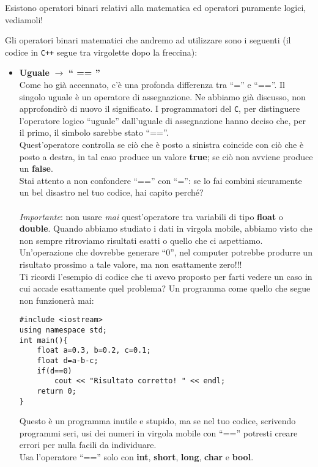 	
	Esistono operatori binari relativi alla matematica ed operatori puramente logici, vediamoli!
	
	Gli operatori binari matematici che andremo ad utilizzare sono i seguenti (il codice in \verb|C++| segue tra virgolette dopo la freccina):
	\begin{itemize}
	\item \textbf{Uguale} $\to$ \textbf{`` == ''}
		\\Come ho già accennato, c'è una profonda differenza tra ``='' e ``==''. Il singolo uguale è un operatore di assegnazione. Ne abbiamo già discusso, non approfondirò di nuovo il significato. I programmatori del \verb|C|, per distinguere l'operatore logico ``uguale'' dall'uguale di assegnazione hanno deciso che, per il primo, il simbolo sarebbe stato ``==''.\\
		Quest'operatore controlla se ciò che è posto a sinistra coincide con ciò che è posto a destra, in tal caso produce un valore \textbf{true}; se ciò non avviene produce un \textbf{false}.\\
		Stai attento a non confondere ``=='' con ``='': se lo fai combini sicuramente un bel disastro nel tuo codice, hai capito perché?\\ \\
		\emph{Importante}: non usare \emph{mai} quest'operatore tra variabili di tipo \textbf{float} o \textbf{double}. Quando abbiamo studiato i dati in virgola mobile, abbiamo visto che non sempre ritroviamo risultati esatti o quello che ci aspettiamo. Un'operazione che dovrebbe generare ``$0$'', nel computer potrebbe produrre un risultato prossimo a tale valore, ma non esattamente zero!!! 
		\\Ti ricordi l'esempio di codice che ti avevo proposto per farti vedere un caso in cui accade esattamente quel problema? Un programma come quello che segue non funzionerà mai:
		\begin{lstlisting}
#include <iostream>
using namespace std;
int main(){
	float a=0.3, b=0.2, c=0.1;
	float d=a-b-c;
	if(d==0)
		cout << "Risultato corretto! " << endl;
	return 0;	
}
		\end{lstlisting}
		Questo è un programma inutile e stupido, ma se nel tuo codice, scrivendo programmi seri, usi dei numeri in virgola mobile con ``=='' potresti creare errori per nulla facili da individuare. \\
		Usa l'operatore ``=='' solo con \textbf{int}, \textbf{short}, \textbf{long}, \textbf{char} e \textbf{bool}.
	 

\end{itemize}
